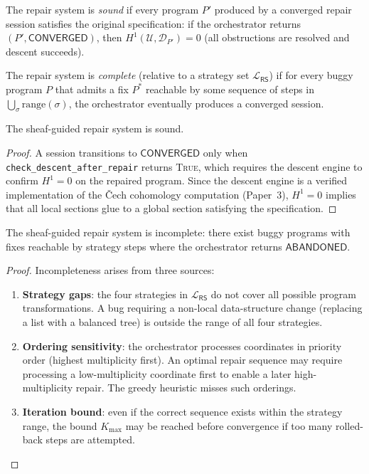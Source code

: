 \documentclass[11pt]{article}
\newcommand{\RS}{\mathsf{RS}}               %
\newcommand{\hone}{H^1}                     %
\begin{document}
\begin{definition}
\label{def:soundness}
The repair system is \emph{sound} if every program $P'$ produced by a
converged repair session satisfies the original specification: if the
orchestrator returns $(P', \mathsf{CONVERGED})$, then
$\hone(\mathcal{U}, \mathcal{D}_{P'}) = 0$ (all obstructions are resolved
and descent succeeds).
\end{definition}

\begin{definition}
\label{def:completeness}
The repair system is \emph{complete} (relative to a strategy set
$\mathcal{L}_\RS$) if for every buggy program $P$ that admits a fix $P^*$
reachable by some sequence of steps in $\bigcup_\sigma \mathrm{range}(\sigma)$,
the orchestrator eventually produces a converged session.
\end{definition}

\begin{theorem}[Soundness]
\label{thm:soundness}
The sheaf-guided repair system is sound.
\end{theorem}
\begin{proof}
A session transitions to $\mathsf{CONVERGED}$ only when
\texttt{check\_descent\_after\_repair} returns \textsc{True},
which requires the descent engine to confirm $H^1 = 0$ on the
repaired program.  Since the descent engine is a verified
implementation of the Čech cohomology computation (Paper~3),
$H^1 = 0$ implies that all local sections glue to a global
section satisfying the specification.
\end{proof}

\begin{proposition}[Incompleteness]
\label{prop:incompleteness}
The sheaf-guided repair system is incomplete: there exist buggy programs
with fixes reachable by strategy steps where the orchestrator returns
$\mathsf{ABANDONED}$.
\end{proposition}
\begin{proof}
Incompleteness arises from three sources:
\begin{enumerate}
  \item \textbf{Strategy gaps}: the four strategies in $\mathcal{L}_\RS$ do
        not cover all possible program transformations.  A bug requiring a
        non-local data-structure change (\eg replacing a list with a balanced
        tree) is outside the range of all four strategies.
  \item \textbf{Ordering sensitivity}: the orchestrator processes coordinates
        in priority order (highest multiplicity first).  An optimal repair
        sequence may require processing a low-multiplicity coordinate first
        to enable a later high-multiplicity repair.  The greedy heuristic
        misses such orderings.
  \item \textbf{Iteration bound}: even if the correct sequence exists within
        the strategy range, the bound $K_{\max}$ may be reached before
        convergence if too many rolled-back steps are attempted.
\end{enumerate}
\end{proof}
\end{document}
